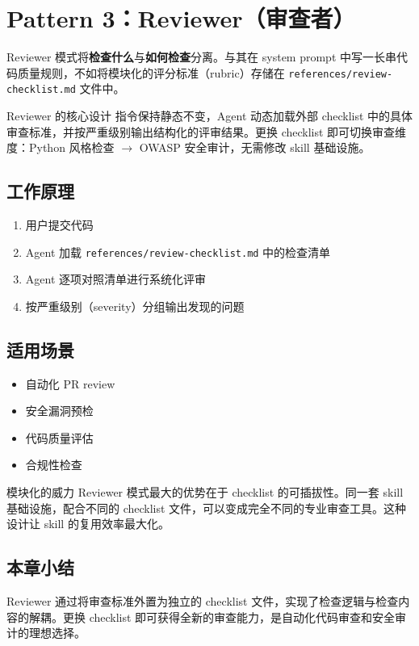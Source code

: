\section{Pattern 3：Reviewer（审查者）}

Reviewer 模式将\textbf{检查什么}与\textbf{如何检查}分离。与其在 system prompt 中写一长串代码质量规则，不如将模块化的评分标准（rubric）存储在 \texttt{references/review-checklist.md} 文件中。

\begin{importantbox}{Reviewer 的核心设计}
指令保持静态不变，Agent 动态加载外部 checklist 中的具体审查标准，并按严重级别输出结构化的评审结果。更换 checklist 即可切换审查维度：Python 风格检查 $\rightarrow$ OWASP 安全审计，无需修改 skill 基础设施。
\end{importantbox}

\subsection{工作原理}

\begin{enumerate}
    \item 用户提交代码
    \item Agent 加载 \texttt{references/review-checklist.md} 中的检查清单
    \item Agent 逐项对照清单进行系统化评审
    \item 按严重级别（severity）分组输出发现的问题
\end{enumerate}

\subsection{适用场景}

\begin{itemize}
    \item 自动化 PR review
    \item 安全漏洞预检
    \item 代码质量评估
    \item 合规性检查
\end{itemize}

\begin{knowledgebox}{模块化的威力}
Reviewer 模式最大的优势在于 checklist 的可插拔性。同一套 skill 基础设施，配合不同的 checklist 文件，可以变成完全不同的专业审查工具。这种设计让 skill 的复用效率最大化。
\end{knowledgebox}

\subsection{本章小结}

Reviewer 通过将审查标准外置为独立的 checklist 文件，实现了检查逻辑与检查内容的解耦。更换 checklist 即可获得全新的审查能力，是自动化代码审查和安全审计的理想选择。

